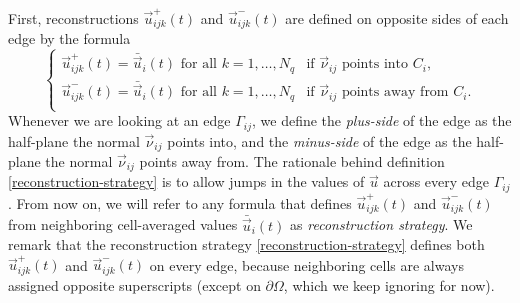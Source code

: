 First, reconstructions $\vec{u}^{+}_{ijk}(t)$ and $\vec{u}^{-}_{ijk}(t)$
are defined on opposite sides of each edge by the formula
\begin{equation} \label{reconstruction-strategy}
\begin{cases}
\vec{u}^{+}_{ijk}(t) = \bar{\vec{u}}_{i}(t) \text{ for all }k=1,\dots,N_{q}
	&\text{if }\vec{\nu}_{ij} \text{ points into } C_i, \\
\vec{u}^{-}_{ijk}(t) = \bar{\vec{u}}_{i}(t) \text{ for all }k=1,\dots, N_{q}
	&\text{if }\vec{\nu}_{ij} \text{ points away from } C_{i}.\\
\end{cases}	
\end{equation}
Whenever we are looking at an edge $\Gamma_{ij}$, we define the
\emph{plus-side} of the edge as the half-plane the normal
$\vec{\nu}_{ij}$ points into, and the \emph{minus-side} of the edge
as the half-plane the normal $\vec{\nu}_{ij}$ points away from.
The rationale behind definition \eqref{reconstruction-strategy}
is to allow jumps in the values of $\vec{u}$ across every edge $\Gamma_{ij}$.
From now on, we will refer to any formula
that defines $\vec{u}^{+}_{ijk}(t)$ and $\vec{u}^{-}_{ijk}(t)$ from neighboring
cell-averaged values $\bar{\vec{u}}_{i}(t)$ as \emph{reconstruction strategy}.
We remark that the reconstruction strategy \eqref{reconstruction-strategy}
defines both $\vec{u}^{+}_{ijk}(t)$ and $\vec{u}^{-}_{ijk}(t)$ on every edge,
because neighboring cells are always assigned opposite superscripts
(except on $\partial\Omega$, which we keep ignoring for now).


